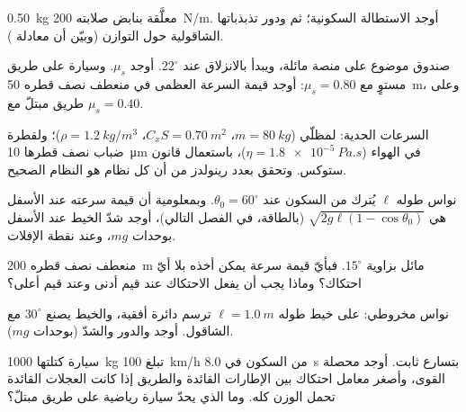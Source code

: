 \begin{exercise}[$\star$]\label{exo:b1:newton-dynamics:4}
 \qty{0.50}{kg} معلَّقة بنابض صلابته \qty{200}{N/m}.
أوجد الاستطالة السكونية؛ ثم  ودور
تذبذباتها الشاقولية حول التوازن (وبيّن أن معادلة ).
\end{exercise}

\begin{exercise}[$\star\star$]\label{exo:b1:newton-dynamics:5}
صندوق موضوع على منصة مائلة، ويبدأ بالانزلاق عند $22^\circ$.
أوجد $\mu_s$. وسيارة على طريق مستوٍ مع $\mu_s = 0.80$: أوجد قيمة السرعة العظمى
في منعطف نصف قطره \qty{50}{m}، وعلى طريق مبتلّ مع $\mu_s = 0.40$.
\end{exercise}

\begin{exercise}[$\star\star$]\label{exo:b1:newton-dynamics:6}
السرعات الحدية: لمظلّي ($m = \qty{80}{kg}$، $C_xS = \qty{0.70}{m^2}$،
$\rho = \qty{1.2}{kg/m^3}$)؛ ولقطرة ضباب نصف قطرها \qty{10}{\micro m}
في الهواء ($\eta = \qty{1.8e-5}{Pa.s}$)، باستعمال قانون ستوكس. وتحقق بعدد
رينولدز من أن كل نظام هو النظام الصحيح.
\end{exercise}

\begin{exercise}[$\star\star$]\label{exo:b1:newton-dynamics:7}
نواس طوله $\ell$ يُترك من السكون عند $\theta_0 = 60^\circ$.
وبمعلومية أن قيمة سرعته عند الأسفل هي $\sqrt{2g\ell(1 - \cos\theta_0)}$
(بالطاقة، في الفصل التالي)، أوجد شدّ الخيط عند الأسفل بوحدات
$mg$، وعند نقطة الإفلات.
\end{exercise}

\begin{exercise}[$\star\star$]\label{exo:b1:newton-dynamics:8}
منعطف نصف قطره \qty{200}{m} مائل بزاوية $15^\circ$. فبأيّ قيمة سرعة يمكن
أخذه بلا أيّ احتكاك؟ وماذا يجب أن يفعل الاحتكاك عند قيم أدنى وعند
قيم أعلى؟
\end{exercise}

\begin{exercise}[$\star\star$]\label{exo:b1:newton-dynamics:9}
نواس مخروطي:  على خيط طوله $\ell = \qty{1.0}{m}$
ترسم دائرة أفقية، والخيط يصنع $30^\circ$ مع
الشاقول. أوجد  والدور والشدّ (بوحدات
$mg$).
\end{exercise}

\begin{exercise}[$\star\star\star$]\label{exo:b1:newton-dynamics:10}
سيارة كتلتها \qty{1000}{kg} تبلغ \qty{100}{km/h} من السكون في \qty{8.0}{s}
بتسارع ثابت. أوجد محصلة القوى، وأصغر
معامل احتكاك بين الإطارات القائدة والطريق إذا كانت
العجلات القائدة تحمل الوزن كله. وما الذي يحدّ سيارة رياضية على طريق مبتلّ؟
\end{exercise}

